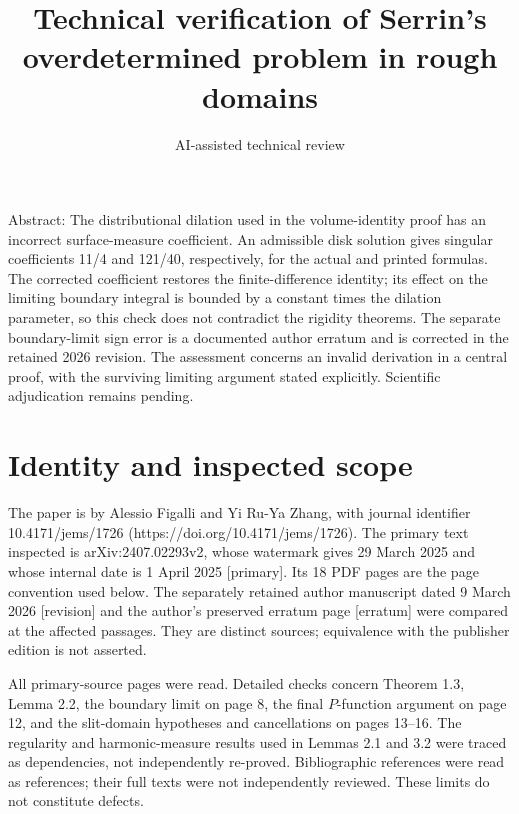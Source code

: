 \documentclass[10pt]{article}
\title{Technical verification of
Serrin’s overdetermined problem in rough domains}
\author{AI-assisted technical review}
\date{}
\begin{document}
\maketitle
Abstract: The distributional dilation used in the volume-identity proof has an incorrect surface-measure coefficient. An admissible disk solution gives singular coefficients 11/4 and 121/40, respectively, for the actual and printed formulas. The corrected coefficient restores the finite-difference identity; its effect on the limiting boundary integral is bounded by a constant times the dilation parameter, so this check does not contradict the rigidity theorems. The separate boundary-limit sign error is a documented author erratum and is corrected in the retained 2026 revision. The assessment concerns an invalid derivation in a central proof, with the surviving limiting argument stated explicitly. Scientific adjudication remains pending.\par
\section*{Identity and inspected scope}
The paper is by Alessio Figalli and Yi Ru-Ya Zhang, with journal identifier 10.4171/jems/1726 (https://doi.org/10.4171/jems/1726). The primary text inspected is arXiv:2407.02293v2, whose watermark gives 29 March 2025 and whose internal date is 1 April 2025 [primary]. Its 18 PDF pages are the page convention used below. The separately retained author manuscript dated 9 March 2026 [revision] and the author’s preserved erratum page [erratum] were compared at the affected passages. They are distinct sources; equivalence with the publisher edition is not asserted.\par
All primary-source pages were read. Detailed checks concern Theorem 1.3, Lemma 2.2, the boundary limit on page 8, the final \(P\)-function argument on page 12, and the slit-domain hypotheses and cancellations on pages 13–16. The regularity and harmonic-measure results used in Lemmas 2.1 and 3.2 were traced as dependencies, not independently re-proved. Bibliographic references were read as references; their full texts were not independently reviewed. These limits do not constitute defects.\par
\end{document}
